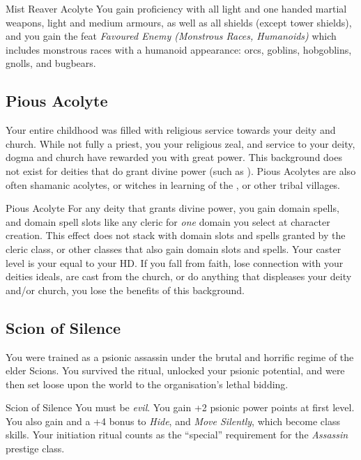 \begin{35e}{Mist Reaver Acolyte}
  You gain proficiency with all light and one handed martial weapons, light and
  medium armours, as well as all shields (except tower shields), and you gain
  the feat \emph{Favoured Enemy (Monstrous Races, Humanoids)} which includes
  monstrous races with a humanoid appearance: orcs, goblins, hobgoblins, gnolls,
  and bugbears.
\end{35e}

\subsection{Pious Acolyte}
\label{sec:background:Pious Acolyte}

Your entire childhood was filled with religious service towards your deity and
church. While not fully a priest, you your religious zeal, and service to your
deity, dogma and church have rewarded you with great power. This background
does not exist for deities that do grant divine power (such as
). Pious Acolytes are also often shamanic acolytes, or
witches in learning of the , or other tribal villages.

\begin{35e}{Pious Acolyte}
  For any deity that grants divine power, you gain domain spells, and domain
  spell slots like any cleric for \emph{one} domain you select at character
  creation. This effect does not stack with domain slots and spells granted by
  the cleric class, or other classes that also gain domain slots and
  spells. Your caster level is your equal to your HD. If you fall from faith,
  lose connection with your deities ideals, are cast from the church, or do
  anything that displeases your deity and/or church, you lose the benefits of
  this background.
\end{35e}

\subsection{Scion of Silence}
\label{sec:Scion of Silence}

You were trained as a psionic assassin under the brutal and horrific regime
of the elder Scions. You survived the ritual, unlocked your psionic potential,
and were then set loose upon the world to the organisation's lethal bidding.

\begin{35e}{Scion of Silence}
  You must be \emph{evil}. You gain +2 psionic power points at first
  level. You also gain and a +4 bonus to \emph{Hide}, and \emph{Move
    Silently}, which become class skills. Your initiation ritual counts as the
  ``special'' requirement for the \emph{Assassin} prestige class.
\end{35e}

